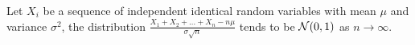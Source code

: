 \begin{theorem}
    Let $X_i$ be a sequence of independent identical random variables with mean $\mu$ and variance $\sigma^2$, the distribution $\displaystyle \frac{X_1 + X_2 + \dots + X_n - n \mu}{\sigma \sqrt{n}}$ tends to be $\mathcal{N}(0,1)$ as $n \rightarrow \infty$.
\end{theorem}






